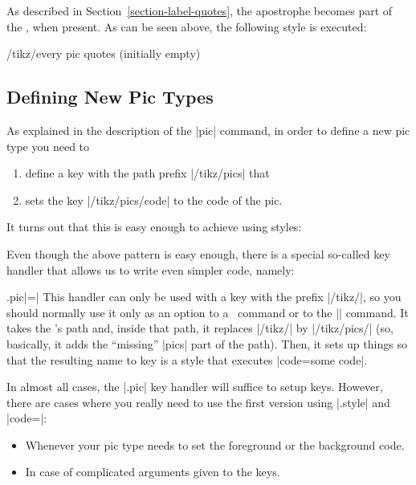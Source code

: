 As described in Section~\ref{section-label-quotes}, the apostrophe becomes part
of the , when present. As can be seen above, the following style
is executed:
%
\begin{stylekey}{/tikz/every pic quotes (initially \normalfont empty)}
\end{stylekey}


\subsection{Defining New Pic Types}
\label{section-new-pic-types}

As explained in the description of the |pic| command, in order to define a new
pic type you need to
%
\begin{enumerate}
    \item define a key with the path prefix |/tikz/pics| that
    \item sets the key |/tikz/pics/code| to the code of the pic.
\end{enumerate}

It turns out that this is easy enough to achieve using styles:

\begin{codeexample}
\end{codeexample}

Even though the above pattern is easy enough, there is a special so-called key
handler that allows us to write even simpler code, namely:
%
\begin{codeexample}
\end{codeexample}

\begin{handler}{{.pic}|=|}
    This handler can only be used with a key with the prefix |/tikz/|, so you
    should normally use it only as an option to a \tikzname\ command or to the
    |\tikzset| command. It takes the 's path and, inside that path,
    it replaces |/tikz/| by |/tikz/pics/| (so, basically, it adds the
    ``missing'' |pics| part of the path). Then, it sets up things so that the
    resulting name to key is a style that executes |code=some code|.
\end{handler}

In almost all cases, the |.pic| key handler will suffice to setup keys.
However, there are cases where you really need to use the first version using
|.style| and |code=|:
%
\begin{itemize}
    \item Whenever your pic type needs to set the foreground or the background
        code.
    \item In case of complicated arguments given to the keys.
\end{itemize}

